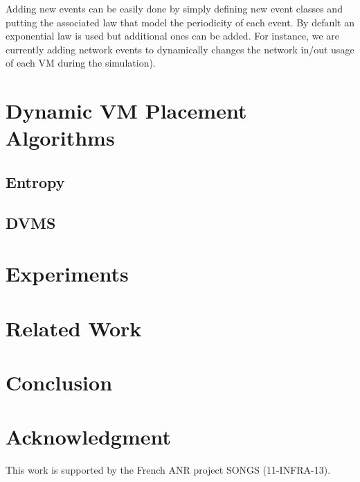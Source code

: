 \documentclass[conference]{IEEEtran}
\begin{document}
Adding new events can be easily done by simply defining new event
classes and putting the associated law that model the periodicity of
each event. By default an exponential law is used but additional ones
can be added. For instance, we  are currently adding network events to
dynamically changes the network in/out usage of each VM during the
simulation).





\section{Dynamic VM Placement Algorithms}
\label{sec:vm-schedulers}
\subsection{Entropy}
\label{subsec:entropy}



\subsection{DVMS}
\label{subsec:dvms}

\section{Experiments}
\label{sec:experiments}
\section{Related Work}
\label{sec:related}
\section{Conclusion}
\label{sec:conclusion}





\section*{Acknowledgment}
This work is supported by the French ANR project SONGS (11-INFRA-13).




\end{document}
